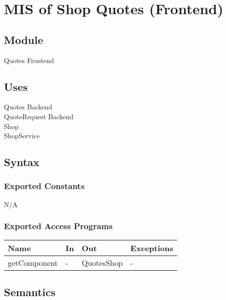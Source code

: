 \documentclass[12pt, titlepage]{article}
\begin{document}


\section{MIS of Shop Quotes (Frontend)} \label{Module} 

\subsection{Module}

Quotes Frontend

\subsection{Uses}

Quotes Backend \\
QuoteRequest Backend \\
Shop \\
ShopService

\subsection{Syntax}

\subsubsection{Exported Constants}

N/A

\subsubsection{Exported Access Programs}

\begin{center}
    \begin{tabular}{p{4cm} p{4cm} p{4cm} p{2cm}}
    \hline
    \textbf{Name} & \textbf{In} & \textbf{Out} & \textbf{Exceptions} \\
    \hline
     getComponent & - & QuotesShop & - \\
    \hline
    \end{tabular}
\end{center}

\subsection{Semantics}
\end{document}
